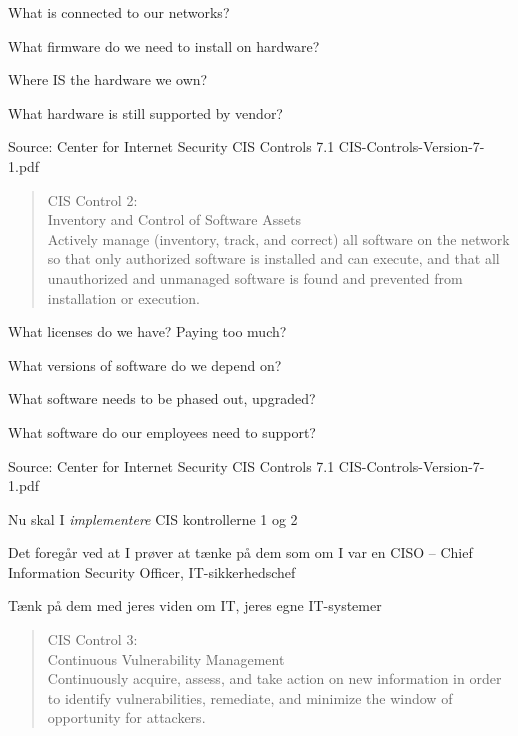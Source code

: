 \documentclass[Screen16to9,17pt]{foils}
\begin{document}
\begin{list1}
\item What is connected to our networks?
\item What firmware do we need to install on hardware?
\item Where IS the hardware we own?
\item What hardware is still supported by vendor?
\end{list1}

Source: Center for Internet Security CIS Controls 7.1 CIS-Controls-Version-7-1.pdf



\begin{quote}
CIS Control 2:\\
Inventory and Control of Software Assets\\
Actively manage (inventory, track, and correct) all software on the network so that only authorized software is installed and can execute, and that all unauthorized and unmanaged software is found and prevented from installation or execution.
\end{quote}

\begin{list1}
\item What licenses do we have? Paying too much?
\item What versions of software do we depend on?
\item What software needs to be phased out, upgraded?
\item What software do our employees need to support?
\end{list1}

Source: Center for Internet Security CIS Controls 7.1 CIS-Controls-Version-7-1.pdf




\begin{list2}
\item Nu skal I \emph{implementere} CIS kontrollerne 1 og 2
\item Det foregår ved at I prøver at tænke på dem som om I var en CISO -- Chief Information Security Officer, IT-sikkerhedschef
\item Tænk på dem med jeres viden om IT, jeres egne IT-systemer
\end{list2}


\begin{quote}
CIS Control 3:\\
Continuous Vulnerability Management\\
Continuously acquire, assess, and take action on new information in order to identify vulnerabilities, remediate, and minimize the window of opportunity for attackers.
\end{quote}
\end{document}
